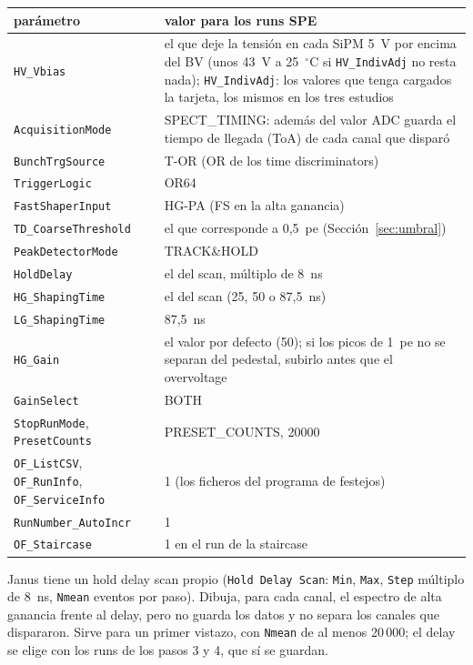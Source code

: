 \documentclass[11pt,a4paper]{article}
\begin{document}
\begin{center}
\small
\begin{tabular}{p{} p{}}
\hline
parámetro & valor para los runs SPE \\
\hline
\texttt{HV\_Vbias} & el que deje la tensión en cada SiPM 5~V por encima del
BV (unos 43~V a 25~$^\circ$C si \texttt{HV\_IndivAdj} no resta nada);
\texttt{HV\_IndivAdj}: los valores que tenga cargados
la tarjeta, los mismos en los tres estudios \\
\texttt{AcquisitionMode} & SPECT\_TIMING: además del valor ADC guarda el tiempo de
llegada (ToA) de cada canal que disparó \\
\texttt{BunchTrgSource} & T-OR (OR de los time discriminators) \\
\texttt{TriggerLogic} & OR64 \\
\texttt{FastShaperInput} & HG-PA (FS en la alta ganancia) \\
\texttt{TD\_CoarseThreshold} & el que corresponde a 0,5~pe (Sección~\ref{sec:umbral}) \\
\texttt{PeakDetectorMode} & TRACK\&HOLD \\
\texttt{HoldDelay} & el del scan, múltiplo de 8~ns \\
\texttt{HG\_ShapingTime} & el del scan (25, 50 o 87,5~ns) \\
\texttt{LG\_ShapingTime} & 87,5~ns \\
\texttt{HG\_Gain} & el valor por defecto (50); si los picos de 1~pe no se
separan del pedestal, subirlo antes que el overvoltage \\
\texttt{GainSelect} & BOTH \\
\texttt{StopRunMode}, \texttt{PresetCounts} & PRESET\_COUNTS, 20000 \\
\texttt{OF\_ListCSV}, \texttt{OF\_RunInfo}, \texttt{OF\_ServiceInfo} & 1 (los
ficheros del programa de festejos) \\
\texttt{RunNumber\_AutoIncr} & 1 \\
\texttt{OF\_Staircase} & 1 en el run de la staircase \\
\hline
\end{tabular}
\end{center}

\noindent Janus tiene un hold delay scan propio (\texttt{Hold Delay Scan}: \texttt{Min}, \texttt{Max},
\texttt{Step} múltiplo de 8~ns, \texttt{Nmean} eventos por paso). Dibuja, para cada canal, el
espectro de alta ganancia frente al delay, pero no guarda los datos y no
separa los canales que dispararon. Sirve para un primer vistazo, con \texttt{Nmean}
de al menos 20\,000; el delay se elige con los runs de los pasos 3 y 4,
que sí se guardan.
\end{document}
